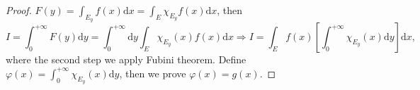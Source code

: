 \begin{proof}
  $F(y) = \int_{E_y}f(x)\mathrm{d} x = \int_E \chi_{E_y}f(x)\mathrm{d} x$, then
  \begin{equation}
    I = \int_0^{+\infty} F(y) \mathrm{d} y = \int_0^{+\infty} \mathrm{d} y \int_E \chi_{E_y}(x) f(x)\mathrm{d} x
    \Rightarrow
    I = \int_E f(x) \left[ \int_0^{+\infty} \chi_{E_y}(x) \mathrm{d} y \right]\mathrm{d} x,
  \end{equation}
  where the second step we apply Fubini theorem.
  Define $\varphi(x) = \int_0^{+\infty} \chi_{E_y}(x)\mathrm{d} y$,
  then we prove $\varphi(x) = g(x)$.
\end{proof}



